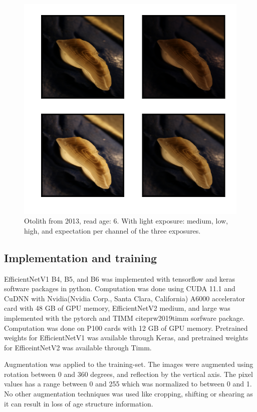 \documentclass[10pt,letterpaper]{article}
\begin{document}
\begin{figure}[h!]
  \caption{Otolith from 2013, read age: 6. With light exposure: medium, low, high, 
  and expectation per channel of the three exposures. }
  \centering
  \includegraphics[scale=1.0]{otolith/2013_70174_Nr06_age09_IMG_0031_32_33.png}
  
  \label{marker1}
\end{figure}

\subsection*{Implementation and training}

EfficientNetV1 B4, B5, and B6 was implemented with  tensorflow \citep{abadi2016tensorflow} and keras \citep{keras} software packages in python. Computation was done using CUDA 11.1 and CuDNN with Nvidia(Nvidia Corp., Santa Clara, California) A6000 accelerator card with 48 GB of GPU memory,
EfficientNetV2 medium, and large was implemented with the pytorch \citep{PyTorch}  and TIMM citep{rw2019timm} sorfware package. Computation was done on P100 cards with 12 GB of GPU memory. Pretrained weights for EfficientNetV1 was available through Keras, and pretrained weights for EfficeintNetV2 was available through Timm.

Augmentation was applied to the training-set. The images were augmented using rotation between 0 and 360 degrees, and reflection by the vertical axis. The pixel values has a range between 0 and 255 which was normalized to between 0 and 1.
No other augmentation techniques was used like  cropping, shifting or shearing as it can result in loss of age structure information.
\end{document}
